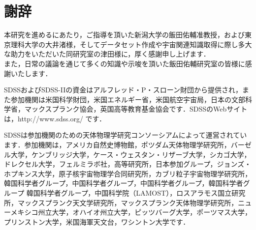 \documentclass[a4j, 11pt]{jreport}
\begin{document}
\newpage


\newpage
\chapter*{謝辞}
本研究を進めるにあたり，ご指導を頂いた新潟大学の飯田佑輔准教授，および東京理科大学の大井渚様，そしてデータセット作成や宇宙関連知識取得に際し多大な助力をいただいた同研究室の津田様に，厚く感謝申し上げます．\\
また，日常の議論を通じて多くの知識や示唆を頂いた飯田佑輔研究室の皆様に感謝いたします．

SDSSおよびSDSS-IIの資金はアルフレッド・P・スローン財団から提供され，また参加機関は米国科学財団，米国エネルギー省，米国航空宇宙局，日本の文部科学省，マックスプランク協会，英国高等教育基金協会です．SDSSのWebサイトは，http://www.sdss.org/ です． 

SDSSは参加機関のための天体物理学研究コンソーシアムによって運営されています．参加機関は，アメリカ自然史博物館，ポツダム天体物理学研究所，バーゼル大学，ケンブリッジ大学，ケース・ウェスタン・リザーブ大学，シカゴ大学，ドレクセル大学，フェルミラボ社，高等研究所，日本参加グループ，ジョンズ・ホプキンス大学，原子核宇宙物理学合同研究所，カブリ粒子宇宙物理学研究所，韓国科学者グループ，中国科学者グループ，中国科学者グループ，韓国科学者グループ 韓国科学者グループ，中国科学院（LAMOST），ロスアラモス国立研究所，マックスプランク天文学研究所，マックスプランク天体物理学研究所，ニューメキシコ州立大学，オハイオ州立大学，ピッツバーグ大学，ポーツマス大学，プリンストン大学，米国海軍天文台，ワシントン大学です．
\end{document}
